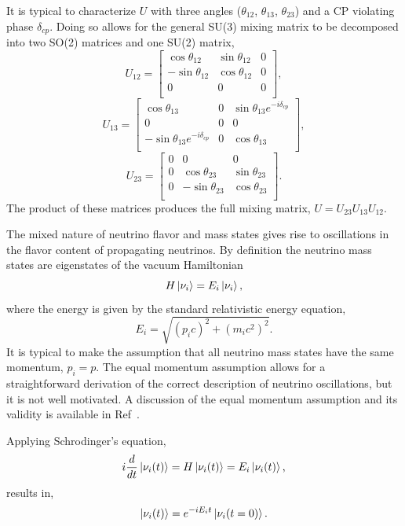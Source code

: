 It is typical to characterize $U$ with three angles
($\theta_{12}$, $\theta_{13}$, $\theta_{23}$) and a CP violating
phase $\delta_{cp}$. Doing so allows for the general SU(3) mixing matrix to
be decomposed into two SO(2) matrices and one SU(2) matrix,
$$U_{12} =
\begin{bmatrix}
    \cos\theta_{12} & \sin\theta_{12} & 0  \\
    -\sin\theta_{12}& \cos\theta_{12} & 0  \\
    0 & 0 & 0  \\
\end{bmatrix},
$$
$$
U_{13} =
\begin{bmatrix}
    \cos\theta_{13} & 0 & \sin\theta_{13}e^{-i\delta_{cp}}\\
    0 & 0 & 0  \\
    -\sin\theta_{13} e^{-i\delta_{cp}} & 0 & \cos\theta_{13}  \\
\end{bmatrix},
$$
$$
U_{23} =
\begin{bmatrix}
    0 & 0 & 0  \\
    0 & \cos\theta_{23} & \sin\theta_{23} \\
    0 & -\sin\theta_{23} & \cos\theta_{23}   \\
\end{bmatrix}.
$$
The product of these matrices produces the full mixing matrix,
$U = U_{23}U_{13}U_{12}$.

The mixed nature of neutrino flavor and mass states gives rise to oscillations
in the flavor content of propagating neutrinos.
By definition the neutrino mass states are eigenstates of the vacuum Hamiltonian
\begin{equation}
    H\ket{\nu_{i}} = E_{i}\ket{\nu_{i}}\text{,}
\end{equation}
where the energy is given by the standard relativistic energy equation,
\begin{equation}
    E_{i} = \sqrt{{(p_{i}c)}^{2} + {(m_{i}c^{2})}^2}\text{.}
\end{equation}
It is typical to make the assumption that all neutrino mass states have the same
momentum, $p_{i} = p$.
The equal momentum assumption allows for a straightforward derivation of the
correct description of neutrino oscillations, but it is not well motivated.
A discussion of the equal momentum assumption and its validity
is available in Ref~\cite{neutrino_osc_subtleties}.

Applying Schrodinger's equation,
\begin{equation}
    i\frac{d}{dt}\ket{\nu_{i}(t)} = H\ket{\nu_{i}(t)} = E_{i}\ket{\nu_{i}(t)}\text{,}
\end{equation}
results in,
\begin{equation}
    \ket{\nu_{i}(t)} = e^{-iE_{i}t}\ket{\nu_{i}(t=0)}\text{.}
    \label{eqn:mass_state_tevol}
\end{equation}

